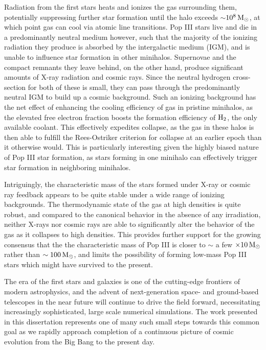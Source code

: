 \documentclass[../thesis.tex]{subfiles}
\begin{document}
Radiation from the first stars heats and ionizes the gas surrounding them, potentially suppressing further star formation until the halo exceeds $\sim$$10^8\,\mathrm{M}_{\odot}$, at which point gas can cool via atomic line transitions.  
Pop III stars live and die in a predominantly neutral medium however, such that the majority of the ionizing radiation they produce is absorbed by the intergalactic medium (IGM), and is unable to influence star formation in other minihalos.  
Supernovae and the compact remnants they leave behind, on the other hand, produce significant amounts of X-ray radiation and cosmic rays.
Since the neutral hydrogen cross-section for both of these is small, they can pass through the predominantly neutral IGM to build up a cosmic background.
Such an ionizing background has the net effect of enhancing the cooling efficiency of gas in pristine minihalos, as the elevated free electron fraction boosts the formation efficiency of $\mathrm{H}_2$, the only available coolant.
This effectively expedites collapse, as the gas in these halos is then able to fulfill the Rees-Ostriker criterion for collapse at an earlier epoch than it otherwise would.
This is particularly interesting given the highly biased nature of Pop III star formation, as stars forming in one minihalo can effectively trigger star formation in neighboring minihalos.

Intriguingly, the characteristic mass of the stars formed under X-ray or cosmic ray feedback appears to be quite stable under a wide range of ionizing backgrounds.
The thermodynamic state of the gas at high densities is quite robust, and compared to the canonical behavior in the absence of any irradiation, neither X-rays nor cosmic rays are able to significantly alter the behavior of the gas as it collapses to high densities.
This provides further support for the growing consensus that the the characteristic mass of Pop III is closer to $\sim$ a few $\times10\,\mathrm{M}_{\odot}$ rather than $\sim100\,\mathrm{M}_{\odot}$, and limits the possibility of forming low-mass Pop III stars which might have survived to the present.

The era of the first stars and galaxies is one of the cutting-edge frontiers of modern astrophysics, and the advent of next-generation space- and ground-based telescopes in the near future will continue to drive the field forward, necessitating increasingly sophisticated, large scale numerical simulations. 
The work presented in this dissertation represents one of many such small steps towards this common goal as we rapidly approach completion of a continuous picture of cosmic evolution from the Big Bang to the present day.
\end{document}
